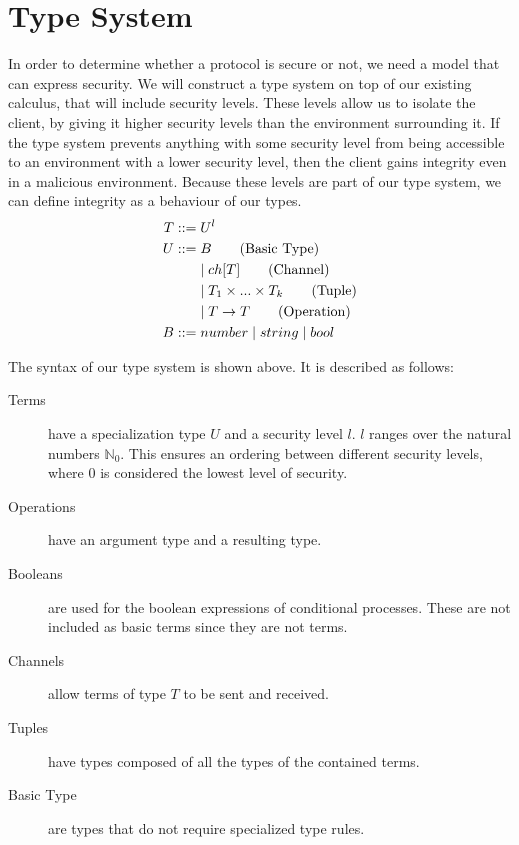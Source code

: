 \section{Type System}\label{ch:type-security}
In order to determine whether a protocol is secure or not, we need a model that can express security.
We will construct a type system on top of our existing calculus, that will include security levels.
These levels allow us to isolate the client, by giving it higher security levels than the environment surrounding it.
If the type system prevents anything with some security level from being accessible to an environment with a lower security level, then the client gains integrity even in a malicious environment.
Because these levels are part of our type system, we can define integrity as a behaviour of our types.
\begin{align*}
    T::=&\;U^l\\    	
    U::=&\;B \tag{Basic Type}\\
        &\mid ch[T] \tag{Channel}\\
        &\mid T_1 \times...\times T_k \tag{Tuple}\\
        &\mid T\rightarrow T \tag{Operation}\\
    B::=&\;number 
        \mid string
        \mid bool\\
\end{align*}

\noindent The syntax of our type system is shown above. It is described as follows:

\begin{description}
    \item[Terms] have a specialization type $U$ and a security level $l$.
        $l$ ranges over the natural numbers $\mathbb{N}_0$.
        This ensures an ordering between different security levels, where $0$ is considered the lowest level of security.
    \item[Operations] have an argument type and a resulting type.
    \item[Booleans] are used for the boolean expressions of conditional processes.
        These are not included as basic terms since they are not terms.
    \item[Channels] allow terms of type $T$ to be sent and received.
    \item[Tuples] have types composed of all the types of the contained terms.
    \item[Basic Type] are types that do not require specialized type rules.
\end{description}

